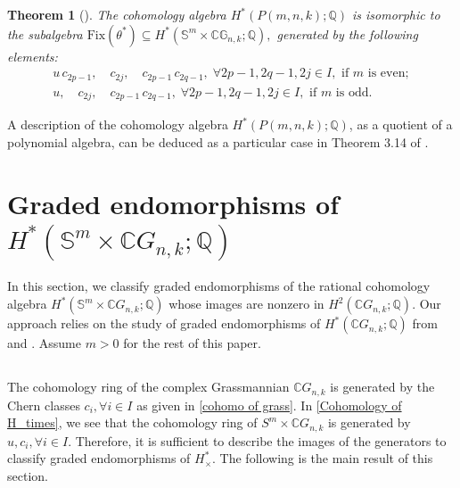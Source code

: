 \documentclass{amsart}
\newtheorem{theorem}{Theorem}[section]
\newcommand{\fix}{\mathrm{Fix}}
\begin{document}
	\begin{theorem}[{\cite[Theorem 3.13]{mandal-sankaran2}}]\label{cohomology of P(m,n,k)}
		The cohomology algebra \( H^*(P(m,n,k); \mathbb{Q}) \) is isomorphic to the subalgebra
		$\mathrm{Fix}(\theta^*) \subseteq H^*(\mathbb{S}^m \times \mathbb{CG}_{n,k}; \mathbb{Q}),$
		generated by the following elements:
		\begin{align*}
			u \, c_{2p-1},\quad c_{2j},\quad c_{2p-1} \, c_{2q-1},\; \forall 2p-1, 2q-1, 2j \in I, \text{ if } m \text{ is even};\\
			u,\quad c_{2j},\quad c_{2p-1} \, c_{2q-1},\; \forall 2p-1, 2q-1, 2j \in I, \text{ if } m \text{ is odd}.
		\end{align*}
	\end{theorem}
	A description of the cohomology algebra $ H^*(P(m,n,k); \mathbb{Q}) $, as a quotient of a polynomial algebra, can be deduced as a particular case in Theorem 3.14 of \cite{mandal-sankaran2}.
	
	
	
	
	
	
	
	
	
	
	\section{Graded endomorphisms of $H^*(\mathbb S^m\times \mathbb CG_{n,k};\mathbb Q)$} \label{section 3}
	
	In this section, we classify graded endomorphisms of the rational cohomology algebra $ H^*(\mathbb S^m\times \mathbb CG_{n,k}; \mathbb{Q}) $ whose images are nonzero in $H^2(\mathbb CG_{n,k};\mathbb Q)$. Our approach relies on the study of graded endomorphisms of $ H^*(\mathbb{C}G_{n,k}; \mathbb{Q}) $ from \cite{glover-homer} and \cite{hoffman}. Assume $m>0$ for the rest of this paper.
	\subsection{} The cohomology ring of the complex Grassmannian $ \mathbb{C}G_{n,k} $ is generated by the Chern classes $c_i,\forall i \in I $ as given in \eqref{cohomo of grass}. In \eqref{Cohomology of H_times}, we see that the cohomology ring of $S^m \times \mathbb{C}G_{n,k}$ is generated by $u, c_i, \forall i \in I$. Therefore, it is sufficient to describe the images of the generators to classify graded endomorphisms of $H_{\times}^*$. The following is the main result of this section.
	
\end{document}
